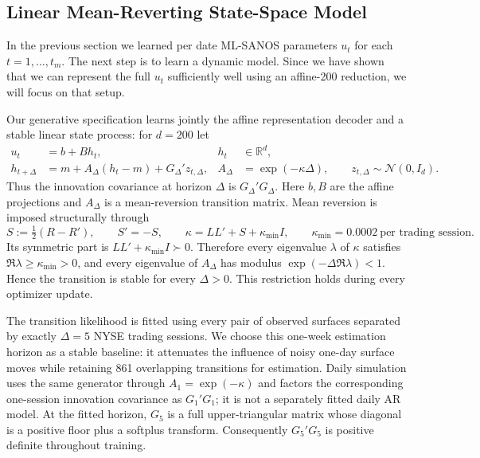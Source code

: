 \documentclass[11pt,a4paper]{article}
\newcommand{\R}{\mathbb{R}}
\begin{document}
\subsection{Linear Mean-Reverting State-Space Model}
\label{sec:affine-state-space-model}

In the previous section we learned per date ML-SANOS parameters $u_t$
for each $t=1,\dots,t_m$. The next step is to learn a dynamic model. Since we have shown that
we can represent the full $u_t$ sufficiently well using an affine-200 reduction, we will focus on that setup.

Our generative specification learns jointly the affine representation decoder and a stable linear state process:
for $d=200$ let
\begin{align}
  u_t&=b+B h_t,
       &h_t&\in\R^d,
       \label{eq:affine-decoder}\\
  h_{t+\Delta}
     &=m+A_\Delta(h_t-m)+G_\Delta' z_{t,\Delta},
       &A_\Delta&=\exp(-\kappa\Delta),
       \qquad z_{t,\Delta}\sim\mathcal N(0,I_d).
       \label{eq:affine-state-space-transition}
\end{align}
Thus the innovation covariance at horizon $\Delta$ is
$G_\Delta'G_\Delta$.  Here $b,B$ are the affine projections and
$A_\Delta$ is a mean-reversion transition matrix. Mean reversion is imposed
structurally through
\begin{equation}
  S:=\tfrac12(R-R'),\qquad S'=-S,\qquad
  \kappa=LL'+S+\kappa_{\min}I,
  \qquad \kappa_{\min}=0.0002\ \text{per trading session}.
  \label{eq:dissipative-generator}
\end{equation}
Its symmetric part is $LL'+\kappa_{\min}I\succ0$. Therefore every eigenvalue
$\lambda$ of $\kappa$ satisfies $\Re\lambda\geq\kappa_{\min}>0$, and every
eigenvalue of $A_\Delta$ has modulus
$\exp(-\Delta\Re\lambda)<1$.  Hence the transition is stable for every
$\Delta>0$.  This restriction holds during every optimizer update. 

 The transition likelihood is fitted using every pair of observed surfaces separated by exactly
$\Delta=5$ NYSE trading sessions.  We choose this
one-week estimation horizon as a stable
baseline: it attenuates the influence of noisy one-day surface moves while
retaining 861 overlapping transitions for estimation.  Daily simulation uses
the same generator through $A_1=\exp(-\kappa)$ and factors the corresponding
one-session innovation covariance as $G_1'G_1$; it is not a separately fitted
daily AR model.  At the fitted horizon, $G_5$ is a
full upper-triangular matrix whose diagonal is a positive floor plus a
softplus transform.  Consequently $G_5'G_5$ is positive definite throughout
training.
\end{document}
